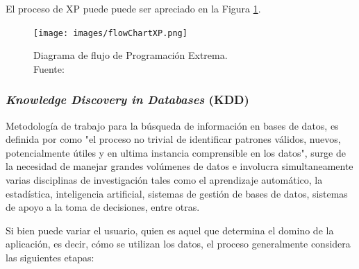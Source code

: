 El proceso de XP puede puede ser apreciado en la Figura \ref{fig:procesoXP}.

\begin{figure}[H]
	\centering
	\captionsetup{justification=centering}
	\texttt{[image: images/flowChartXP.png]}
	\caption[Diagrama de flujo de Programación Extrema.]{Diagrama de flujo de Programación Extrema.\\Fuente: \cite{XP}}
	\label{fig:procesoXP}
\end{figure}

\subsubsection*{\textit{Knowledge Discovery in Databases} (KDD)}
\label{subsubsec:kdd}

Metodología de trabajo para la búsqueda de información en bases de datos, es definida por \cite{KDDFayyad} como "el proceso no trivial de identificar patrones válidos, nuevos, potencialmente útiles y en ultima instancia comprensible en los datos", surge de la necesidad de manejar grandes volúmenes de datos e involucra simultaneamente varias disciplinas de investigación tales como el aprendizaje automático, la estadística, inteligencia artificial, sistemas de gestión de bases de datos, sistemas de apoyo a la toma de decisiones, entre otras.

Si bien puede variar el usuario, quien es aquel que determina el domino de la aplicación, es decir, cómo se utilizan los datos, el proceso generalmente considera las siguientes etapas:

